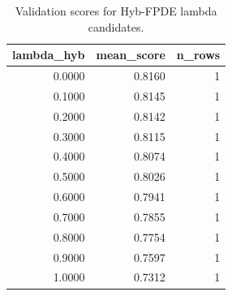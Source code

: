 \begin{table}[t]
\caption{Validation scores for Hyb-FPDE lambda candidates.}
\label{tab:lambda_distribution_computed}
\centering
\begin{tabular}{rrr}
\toprule
lambda\_hyb & mean\_score & n\_rows \\
\midrule
0.0000 & 0.8160 & 1 \\
0.1000 & 0.8145 & 1 \\
0.2000 & 0.8142 & 1 \\
0.3000 & 0.8115 & 1 \\
0.4000 & 0.8074 & 1 \\
0.5000 & 0.8026 & 1 \\
0.6000 & 0.7941 & 1 \\
0.7000 & 0.7855 & 1 \\
0.8000 & 0.7754 & 1 \\
0.9000 & 0.7597 & 1 \\
1.0000 & 0.7312 & 1 \\
\bottomrule
\end{tabular}

\end{table}

